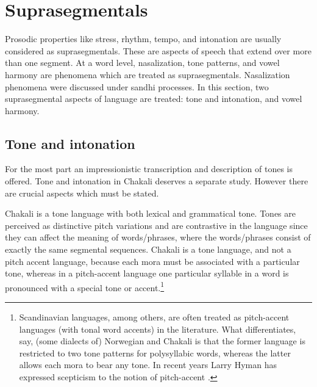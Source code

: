



\section{Suprasegmentals}
\label{sec:suprasegmentals}


Prosodic properties like stress, rhythm, tempo, and intonation are usually
considered as suprasegmentals. These are aspects of speech that extend over
more than one segment.  At a word level,  nasalization, tone patterns, and vowel
harmony are phenomena which are treated as suprasegmentals. Nasalization
phenomena were discussed under sandhi processes.  In this section,  two
suprasegmental aspects of language are treated: tone and intonation, and vowel
harmony.


\subsection{Tone and intonation}
\label{sec:tone-intonation}

For the most part an impressionistic transcription and description of tones is 
offered. Tone and intonation in Chakali deserves a separate study.  However 
there are crucial aspects which must be stated. 


Chakali is a tone language with both lexical and grammatical tone. Tones are
perceived as distinctive pitch variations and are contrastive in the language
since they can affect the meaning of  words/phrases, where the words/phrases
consist of exactly the same segmental sequences.  Chakali is a tone language,
and not a pitch accent language, because each mora must be associated with a
particular tone, whereas in a pitch-accent language one particular syllable in a
word is pronounced with a special tone or accent.\footnote{Scandinavian
languages, among others, are often treated as pitch-accent languages (with tonal
word accents) in the literature. What differentiates, say,  (some dialects of)
Norwegian and Chakali is that the former language is restricted to two tone 
patterns for polysyllabic words,  whereas the latter allows each  mora to bear 
any tone.  In recent years Larry Hyman has expressed  scepticism to the notion 
of pitch-accent   \citep{Hyma07}.}   


